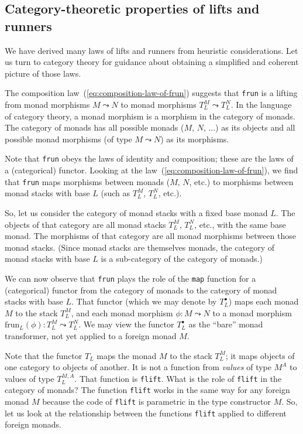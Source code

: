 \subsection{Category-theoretic properties of lifts and runners\label{subsec:Category-theoretic-properties-of-lifts-and-runners-functors-in-category-of-monads}}

We have derived many laws of lifts and runners from heuristic considerations.
Let us turn to category theory for guidance about obtaining a simplified
and coherent picture of those laws.

The composition law~(\ref{eq:composition-law-of-frun}) suggests
that \lstinline!frun! is a lifting from monad morphisms $M\leadsto N$
to monad morphisms $T_{L}^{M}\leadsto T_{L}^{N}$. In the language
of category theory, a monad morphism is a morphism in the category
of monads. The category of monads has all possible monads ($M$, $N$,
...) as its objects and all possible monad morphisms (of type $M\leadsto N$)
as its morphisms. 

Note that \lstinline!frun! obeys the laws of identity and composition;
these are the laws of a (categorical) functor. Looking at the law~(\ref{eq:composition-law-of-frun}),
we find that \lstinline!frun! maps morphisms between monads ($M$,
$N$, etc.) to morphisms between monad stacks with base $L$ (such
as $T_{L}^{M}$, $T_{L}^{N}$, etc.). 

So, let us consider the category of monad
stacks with a fixed base monad $L$. The objects of that category
are all monad stacks $T_{L}^{M}$, $T_{L}^{N}$, etc., with the same
base monad. The morphisms of that category are all monad morphisms
between those monad stacks. (Since monad stacks are themselves monads,
the category of monad stacks with base $L$ is a sub-category of the
category of monads.) 

We can now observe that \lstinline!frun! plays the role of the \lstinline!map!
function for a (categorical) functor from the category of monads to
the category of monad stacks with base $L$. That functor (which we
may denote by $T_{L}^{\bullet}$) maps each monad $M$ to the stack
$T_{L}^{M}$, and each monad morphism $\phi:M\leadsto N$ to a monad
morphism $\text{frun}_{L}(\phi):T_{L}^{M}\leadsto T_{L}^{N}$. We
may view the functor $T_{L}^{\bullet}$ as the \textsf{``}bare\textsf{''} monad transformer,
not yet applied to a foreign monad $M$.

Note that the functor $T_{L}$ maps the monad $M$ to the stack $T_{L}^{M}$;
it maps objects of one category to objects of another. It is not a
function from \emph{values} of type $M^{A}$ to values of type $T_{L}^{M,A}$.
That function is \lstinline!flift!. What is the role of \lstinline!flift!
in the category of monads? The function \lstinline!flift! works in
the same way for any foreign monad $M$ because the code of \lstinline!flift!
is parametric in the type constructor $M$. So, let us look at the
relationship between the functions \lstinline!flift! applied to different
foreign monads.

